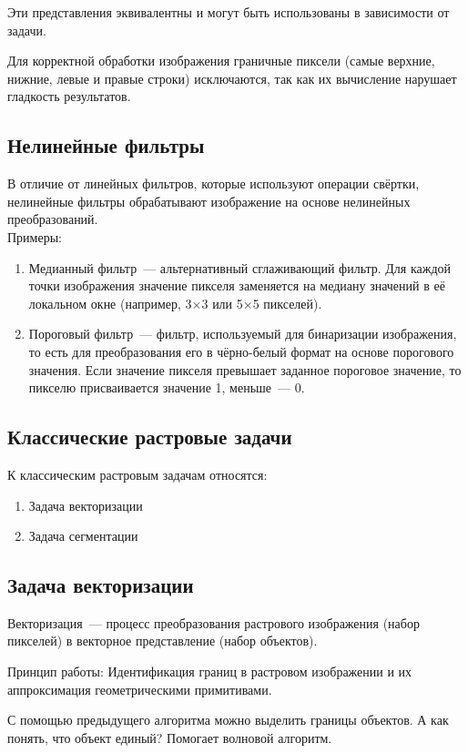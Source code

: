 Эти представления эквивалентны и могут быть использованы в зависимости от задачи.

Для корректной обработки изображения граничные пиксели (самые верхние, нижние, левые и правые строки) исключаются, так как их вычисление нарушает гладкость результатов.

\subsection{Нелинейные фильтры}
В отличие от линейных фильтров, которые используют операции свёртки, нелинейные фильтры обрабатывают изображение на основе нелинейных преобразований.
\\

Примеры:
\begin{enumerate}
    \item Медианный фильтр~--- альтернативный сглаживающий фильтр. Для каждой точки изображения значение пикселя заменяется на медиану значений в её локальном окне (например, 3×3 или 5×5 пикселей).
    \item Пороговый фильтр~--- фильтр, используемый для бинаризации изображения, то есть для преобразования его в чёрно-белый формат на основе порогового значения. Если значение пикселя превышает заданное пороговое значение, то пикселю присваивается значение 1, меньше~--- 0.
\end{enumerate}

\subsection{Классические растровые задачи}
К классическим растровым задачам относятся:
\begin{enumerate}
    \item Задача векторизации
    \item Задача сегментации
\end{enumerate}

\subsection{Задача векторизации}
Векторизация~--- процесс преобразования растрового изображения (набор пикселей) в векторное представление (набор объектов).

Принцип работы: Идентификация границ в растровом изображении и их аппроксимация геометрическими примитивами.

С  помощью предыдущего алгоритма можно выделить границы объектов. А как понять, что объект единый? Помогает волновой алгоритм.

